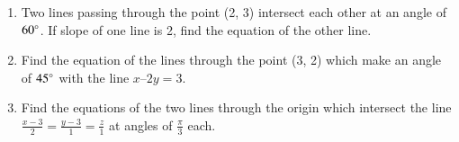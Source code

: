 \begin{enumerate}[label=\thesubsection.\arabic*,ref=\thesubsection.\theenumi]
	\item
 Two lines passing through the point (2, 3) intersect each other at an angle of $60\degree$. If slope of one line is 2, find the equation of the other line.
\label{chapters/11/10/3/12}
 \\
 \solution
		
\item Find the equation of the lines through the point (3, 2) which make an angle of $45\degree$  with the line $x – 2y = 3$.
\label{chapters/11/10/4/11}\\
\solution

\item Find the equations of the two lines through the origin which intersect the line $ \frac{x-3}{2}=\frac{y-3}{1}=\frac{z}{1}$ at angles of  $\frac{\pi}{3}$ each.
\end{enumerate}
